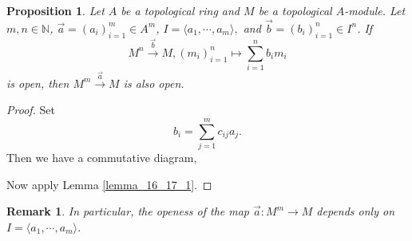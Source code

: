 \documentclass[8pt]{article}
\numberwithin{equation}{section}
\newtheorem{proposition}{Proposition}[subsection]
\newtheorem{remark}{Remark}[subsection]
\newcommand{\N}[0]{\mathbb{N}}
\begin{document}
\begin{proposition}
    \label{fact_16_17}
    Let $A$ be a topological ring and $M$ be a topological $A$-module. 
    Let $m,n\in\N$, $\vec{a} = (a_i)_{i=1}^m\in A^m$, $I= \langle a_1,\cdots,a_m\rangle,$ and $\vec{b} = (b_i)_{i=1}^n\in I^n$. If 
    \begin{equation*}
        M^n\stackrel{\vec{b}}{\to}M, (m_i)_{i=1}^n\mapsto \sum_{i=1}^n b_im_i
    \end{equation*}
    is open, then $M^m\stackrel{\vec{a}}{\to}M$ is also open.
\end{proposition}
\begin{proof}
    Set 
    \begin{equation*}
        b_i =\sum_{j=1}^m c_{ij}a_j.
    \end{equation*}
    Then we have a commutative diagram,
    \begin{center}
    \end{center}
    Now apply Lemma \ref{lemma_16_17_1}.
\end{proof}

\begin{remark}
    In particular, the openess of the map $\vec{a}:M^m\to M$ depends only on $I = \langle a_1,\cdots,a_m\rangle$.
\end{remark}
\end{document}
